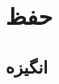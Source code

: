 \chapter{حفظ  }
\label{chap:FeaturePrivacy}
\begin{abstract}
\end{abstract}

\section{انگیزه}
\label{sec:motivationExtens}
